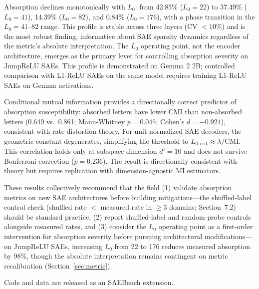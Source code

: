 \documentclass{article}
\begin{document}
Absorption declines monotonically with $L_0$: from 42.85\% ($L_0{=}22$) to 37.49\% ($L_0{=}41$), 14.39\% ($L_0{=}82$), and 0.84\% ($L_0{=}176$), with a phase transition in the $L_0 = 41$--82 range. This profile is stable across three layers (CV $< 10\%$) and is the most robust finding, informative about SAE sparsity dynamics regardless of the metric's absolute interpretation. The $L_0$ operating point, not the encoder architecture, emerges as the primary lever for controlling absorption severity on JumpReLU SAEs. This profile is demonstrated on Gemma 2 2B; controlled comparison with L1-ReLU SAEs on the same model requires training L1-ReLU SAEs on Gemma activations.

Conditional mutual information provides a directionally correct predictor of absorption susceptibility: absorbed letters have lower CMI than non-absorbed letters (0.649 vs.\ 0.861; Mann-Whitney $p = 0.045$; Cohen's $d = -0.924$), consistent with rate-distortion theory. For unit-normalized SAE decoders, the geometric constant degenerates, simplifying the threshold to $L_{0,\text{crit}} \approx \lambda / \text{CMI}$. This correlation holds only at subspace dimension $d' = 10$ and does not survive Bonferroni correction ($p = 0.236$). The result is directionally consistent with theory but requires replication with dimension-agnostic MI estimators.

These results collectively recommend that the field (1) validate absorption metrics on new SAE architectures before building mitigations---the shuffled-label control check (shuffled rate $<$ measured rate in $\geq 3$ domains; Section~7.2) should be standard practice, (2) report shuffled-label and random-probe controls alongside measured rates, and (3) consider the $L_0$ operating point as a first-order intervention for absorption severity before pursuing architectural modifications---on JumpReLU SAEs, increasing $L_0$ from 22 to 176 reduces measured absorption by 98\%, though the absolute interpretation remains contingent on metric recalibration (Section~\ref{sec:metric}).

Code and data are released as an SAEBench extension.




\end{document}
